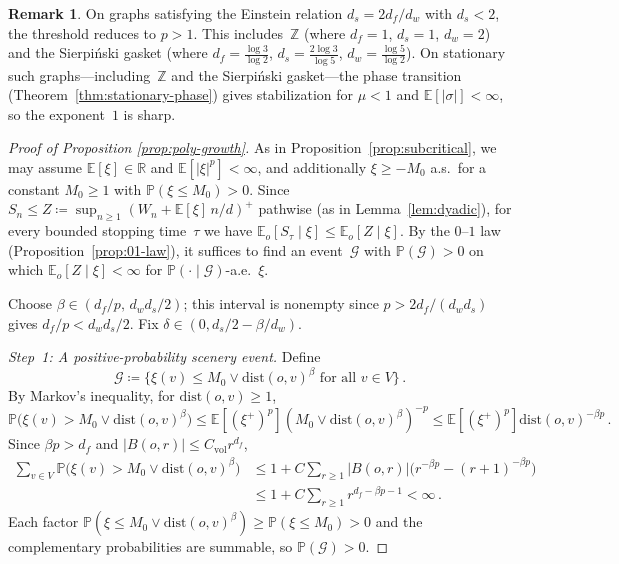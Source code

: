 \documentclass[aop]{imsart}
\theoremstyle{plain}
\theoremstyle{definition}
\newtheorem{remark}[theorem]{Remark}
\newcommand{\Z}{\mathbb{Z}}
\newcommand{\R}{\mathbb{R}}
\newcommand{\E}{\mathbb{E}}
\renewcommand{\P}{\mathbb{P}}
\begin{document}
	\begin{remark}\label{rem:poly-growth-examples}
		On graphs satisfying the Einstein relation $d_s=2d_f/d_w$ with $d_s<2$, the threshold reduces to $p>1$. This includes~$\Z$ (where $d_f=1$, $d_s=1$, $d_w=2$) and the Sierpi\'nski gasket (where $d_f=\frac{\log 3}{\log 2}$, $d_s=\frac{2\log 3}{\log 5}$, $d_w=\frac{\log 5}{\log 2}$). On stationary such graphs---including~$\Z$ and the Sierpi\'nski gasket---the phase transition (Theorem~\ref{thm:stationary-phase}) gives stabilization for $\mu < 1$ and $\E[|\sigma|]<\infty$, so the exponent~$1$ is sharp.
	\end{remark}
	
	\begin{proof}[Proof of Proposition \ref{prop:poly-growth}]
		As in Proposition~\ref{prop:subcritical}, we may assume $\E[\xi]\in\R$ and $\E[|\xi|^p]<\infty$, and additionally $\xi\geq -M_0$ a.s.\ for a constant $M_0\geq 1$ with $\P(\xi\leq M_0)>0$. Since $S_n\leq Z\coloneqq\sup_{n\geq 1}(W_n+\E[\xi]\,n/d)^+$ pathwise (as in Lemma~\ref{lem:dyadic}), for every bounded stopping time~$\tau$ we have $\E_o[S_\tau\mid\xi]\leq\E_o[Z\mid\xi]$. By the $0$--$1$ law (Proposition~\ref{prop:01-law}), it suffices to find an event~$\mathcal{G}$ with $\P(\mathcal{G})>0$ on which $\E_o[Z\mid\xi]<\infty$ for $\P(\cdot\mid\mathcal{G})$-a.e.~$\xi$.
		
		Choose $\beta\in(d_f/p,\,d_w d_s/2)$; this interval is nonempty since $p>2d_f/(d_w d_s)$ gives $d_f/p<d_w d_s/2$. Fix $\delta\in(0, d_s/2-\beta/d_w)$.
		
		\emph{Step~1: A positive-probability scenery event.}
		Define
		\[
		\mathcal{G} \coloneqq \bigl\{\xi(v)\leq M_0 \vee \mathrm{dist}(o,v)^\beta \text{ for all } v\in V\bigr\}\,.
		\]
		By Markov's inequality, for $\mathrm{dist}(o,v)\geq 1$,
		\[
		\P\bigl(\xi(v)>M_0\vee \mathrm{dist}(o,v)^\beta\bigr)
		\leq \E[(\xi^+)^p](M_0\vee \mathrm{dist}(o,v)^\beta)^{-p}
		\leq \E[(\xi^+)^p] \mathrm{dist}(o,v)^{-\beta p}\,.
		\]
		Since $\beta p>d_f$ and $|B(o,r)|\leq C_{\mathrm{vol}} r^{d_f}$,
		\begin{align*}
			\sum_{v\in V}\P\bigl(\xi(v)>M_0\vee \mathrm{dist}(o,v)^\beta\bigr)
			&\leq 1 + C\sum_{r\geq 1}|B(o,r)|\bigl(r^{-\beta p}-(r{+}1)^{-\beta p}\bigr) \\
			&\leq 1 + C\sum_{r\geq 1}r^{d_f-\beta p-1}
			< \infty\,.
		\end{align*}
		Each factor $\P(\xi\leq M_0\vee \mathrm{dist}(o,v)^\beta)\geq\P(\xi\leq M_0)>0$ and the complementary probabilities are summable, so $\P(\mathcal{G})>0$.
		

\end{proof}
\end{document}
